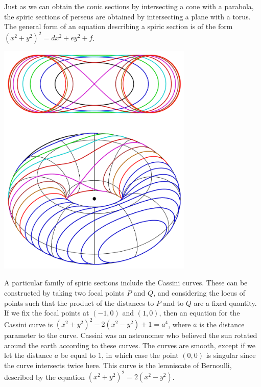 \begin{example}
    Just as we can obtain the conic sections by intersecting a cone with a parabola, the spiric sections of perseus are obtained by intersecting a plane with a torus. The general form of an equation describing a spiric section is of the form $(x^2 + y^2)^2 = dx^2 + ey^2 + f$.
    \begin{center}
        \includegraphics[width=0.7\textwidth]{SpiricSection.png}
    \end{center}
    A particular family of spiric sections include the Cassini curves. These can be constructed by taking two focal points $P$ and $Q$, and considering the locus of points such that the product of the distances to $P$ and to $Q$ are a fixed quantity. If we fix the focal points at $(-1,0)$ and $(1,0)$, then an equation for the Cassini curve is $(x^2 + y^2)^2 - 2(x^2 - y^2) + 1 = a^4$, where $a$ is the distance parameter to the curve. Cassini was an astronomer who believed the sun rotated around the earth according to these curves. The curves are smooth, except if we let the distance $a$ be equal to $1$, in which case the point $(0,0)$ is singular since the curve intersects twice here. This curve is the lemniscate of Bernoulli, described by the equation $(x^2 + y^2)^2 = 2(x^2 - y^2)$.
\end{example}

